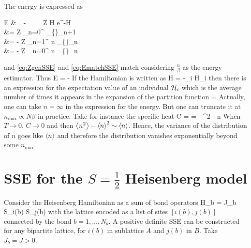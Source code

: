 		The energy is expressed as
		\be \begin{split} E &= - =  =  Z \tr \mc H e^{-\beta \mc H} \\ &=  Z \sum_{n=0}^\infty {} \sum_{\{\alpha\}_{n+1}}  \cdots {} \\ &= -  Z \sum_{n=1}^\infty {} \frac n \beta \sum_{\{\alpha\}_n}  \cdots {} \\ &= -  Z \sum_{n=0}^\infty {} \frac n \beta \sum_{\{\alpha\}_n}  \cdots {} \end{split} \label{eq:EmatchSSE} \ee
		and \eqref{eq:ZgenSSE} and \eqref{eq:EmatchSSE} match considering $\frac n \beta$ as the energy estimator. Thus
		\be E = - \ee
		If the Hamiltonian is written as
		\be \mc H = -\sum_i \mc H_i \ee
		then there is an expression for the expectation value of an individual $\mathcal H_i$ which is the average number of times it appears in the expansion of the partition function
		\be {} =  \ee
		Actually, one can take $n=\infty$ in the expression for the energy. But one can truncate it at $n_\text{max}\propto N\beta$ in practice. Take for instance the specific heat
		\be C =  =  - ^2 - \ev n \ee
		When $T\to 0$, $C\to 0$ and then $\ev{n^2} - \ev{n}^2 \sim \ev n$. Hence, the variance of the distribution of $n$ goes like $\ev n$ and therefore the distribution vanishes exponentially beyond some $n_\text{max}$.

	\section{SSE for the $S=\frac12$ Heisenberg model}

		Consider the Heisenberg Hamiltonian as a sum of bond operators
		\be \mc H_b = J_b \vb* S_{i(b)} \cdot \vb* S_{j(b)} \ee
		with the lattice encoded as a list of sites $[i(b), j(b)]$ connected by the bond $b=1,\dotsc, N_b$. A positive definite SSE can be constructed for any bipartite lattice, for $i(b)$ in sublattice $A$ and $j(b)$ in $B$. Take $J_b=J>0$.

